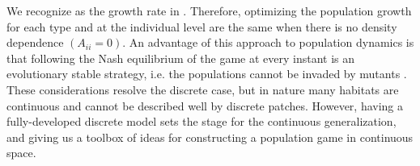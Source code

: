 We recognize  as the growth rate in . Therefore, optimizing the population growth for each type and at the individual level are the same when there is no density dependence $(A_{ii}=0)$. An advantage of this approach to population dynamics is that following the Nash equilibrium of the game  at every instant is an evolutionary stable strategy, i.e. the populations cannot be invaded by mutants \citep{kvrivan2009evolutionary}. These considerations resolve the discrete case, but in nature many habitats are continuous and cannot be described well by discrete patches. However, having a fully-developed discrete model sets the stage for the continuous generalization, and giving us a toolbox of ideas for constructing a population game in continuous space.


